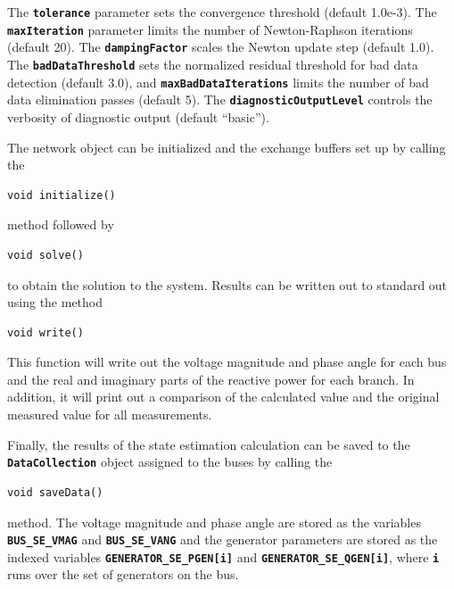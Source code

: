 The \texttt{\textbf{tolerance}} parameter sets the convergence threshold (default 1.0e-3). The \texttt{\textbf{maxIteration}} parameter limits the number of Newton-Raphson iterations (default 20). The \texttt{\textbf{dampingFactor}} scales the Newton update step (default 1.0). The \texttt{\textbf{badDataThreshold}} sets the normalized residual threshold for bad data detection (default 3.0), and \texttt{\textbf{maxBadDataIterations}} limits the number of bad data elimination passes (default 5). The \texttt{\textbf{diagnosticOutputLevel}} controls the verbosity of diagnostic output (default ``basic'').

The network object can be initialized and the exchange buffers set up by calling the

{
\color{red}
\begin{Verbatim}[fontseries=b]
void initialize()
\end{Verbatim}
}

method followed by

{
\color{red}
\begin{Verbatim}[fontseries=b]
void solve()
\end{Verbatim}
}

to obtain the solution to the system. Results can be written out to standard out using the method

{
\color{red}
\begin{Verbatim}[fontseries=b]
void write()
\end{Verbatim}
}

This function will write out the voltage magnitude and phase angle for each bus and the real and imaginary parts of the reactive power for each branch. In addition, it will print out a comparison of the calculated value and the original measured value for all measurements.

Finally, the results of the state estimation calculation can be saved to the \texttt{\textbf{DataCollection}} object assigned to the buses by calling the 

{
\color{red}
\begin{Verbatim}[fontseries=b]
void saveData()
\end{Verbatim}
}

method. The voltage magnitude and phase angle are stored as the variables \texttt{\textbf{BUS\_SE\_VMAG}} and \texttt{\textbf{BUS\_SE\_VANG}} and the generator parameters are stored as the indexed variables \texttt{\textbf{GENERATOR\_SE\_PGEN[i]}} and \texttt{\textbf{GENERATOR\_SE\_QGEN[i]}}, where \texttt{\textbf{i}} runs over the set of generators on the bus.
\newline
\hyperlink{topDoc}{\color{blue}{Top}}
